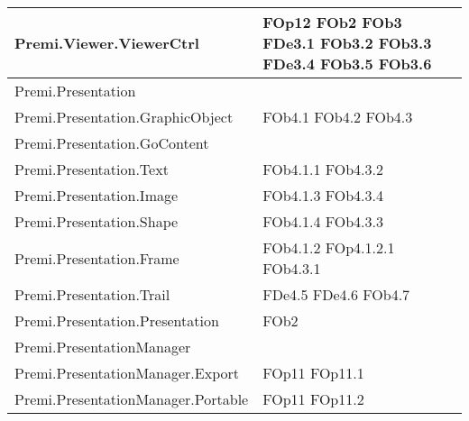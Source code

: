 \begin{longtable}{|p{10cm}|p{4cm}|}
\hline
Premi.Viewer.ViewerCtrl & FOp12 \linebreak FOb2 \linebreak FOb3 \linebreak FDe3.1 \linebreak FOb3.2 \linebreak FOb3.3 \linebreak FDe3.4 \linebreak FOb3.5 \linebreak FOb3.6 \linebreak \\
\hline
Premi.Presentation & \\
\hline
Premi.Presentation.GraphicObject & FOb4.1 \linebreak FOb4.2 \linebreak FOb4.3 \linebreak \\
\hline
Premi.Presentation.GoContent & \\
\hline
Premi.Presentation.Text & FOb4.1.1 \linebreak FOb4.3.2 \linebreak \\
\hline
Premi.Presentation.Image & FOb4.1.3 \linebreak FOb4.3.4 \linebreak \\
\hline
Premi.Presentation.Shape & FOb4.1.4 \linebreak FOb4.3.3 \linebreak \\
\hline
Premi.Presentation.Frame & FOb4.1.2 \linebreak FOp4.1.2.1 \linebreak FOb4.3.1 \linebreak \\
\hline
Premi.Presentation.Trail & FDe4.5 \linebreak FDe4.6 \linebreak FOb4.7 \linebreak \\
\hline
Premi.Presentation.Presentation & FOb2 \linebreak \\
\hline
Premi.PresentationManager & \\
\hline
Premi.PresentationManager.Export & FOp11 \linebreak FOp11.1 \linebreak \\
\hline
Premi.PresentationManager.Portable & FOp11 \linebreak FOp11.2 \linebreak \\

\end{longtable}
